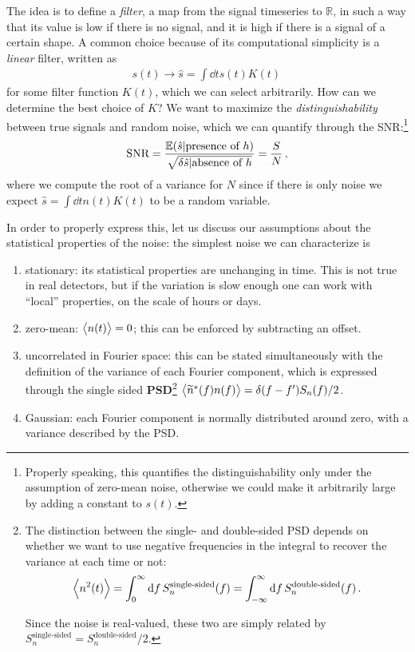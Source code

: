 \documentclass[main.tex]{subfiles}
\begin{document}
The idea is to define a \emph{filter}, a  map from the signal timeseries to \(\mathbb{R}\), in such a way that its value is low if there is no signal, and it is high if there is a signal of a certain shape. 
A common choice because of its computational simplicity is a \emph{linear} filter, written as 
%
\begin{align}
s(t) \to \hat{s} = \int \dd{t} s(t) K(t)
\,
\end{align}
%
for some filter function \(K(t)\), which we can select arbitrarily.
How can we determine the best choice of \(K\)?
We want to maximize the \emph{distinguishability} between true signals and random noise, which we can quantify through the \ac{SNR}:\footnote{Properly speaking, this quantifies the distinguishability only under the assumption of zero-mean noise, otherwise we could make it arbitrarily large by adding a constant to \(s(t)\).}
%
\begin{align}
\text{SNR} = \frac{\mathbb{E}(\hat{s} | \text{presence of \(h\)}) }{\sqrt{\var{\hat{s} | \text{absence of \(h\)}}}} = \frac{S}{N}
\,,
\end{align}
%
where we compute the root of a variance for \(N\) since if there is only noise we expect \(\hat{s} = \int \dd{t} n(t) K(t)\) to be a random variable.

In order to properly express this, let us discuss our assumptions about the statistical properties of the noise: the simplest noise we can characterize is 
\begin{enumerate}
    \item stationary: its statistical properties are unchanging in time. This is not true in real detectors, but if the variation is slow enough one can work with ``local'' properties, on the scale of hours or days.
    \item zero-mean: \(\expval{n(t)} =0\); this can be enforced by subtracting an offset.
    \item uncorrelated in Fourier space: this can be stated simultaneously with the definition of the variance of each Fourier component, which is expressed through the single sided \textbf{\ac{PSD}}\footnote{The distinction between the single- and double-sided \ac{PSD} depends on whether we want to use negative frequencies in the integral to recover the variance at each time or not: 
    \begin{align}
    \expval{n^2(t)} 
    = \int_{0}^{\infty } \dd{f} S_n^{\text{single-sided}}(f)
    = \int_{-\infty }^{\infty } \dd{f} S_n^{\text{double-sided}}(f)
    \,.
    \end{align}
    
    Since the noise is real-valued, these two are simply related by \(S_n^{\text{single-sided}} = S_n^{\text{double-sided}}/2\).
    } \(\expval{\widetilde{n}^{*}(f ) n(f )} = \delta (f - f' ) S_n(f ) / 2\). 
    \item Gaussian: each Fourier component is normally distributed around zero, with a variance described by the \ac{PSD}.
\end{enumerate}
\end{document}
